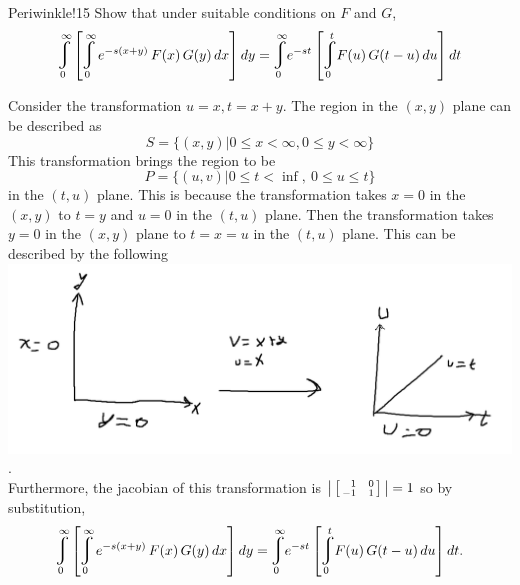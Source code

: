 \documentclass[titlepage]{article}
\begin{document}
\begin{cproblem}{5}{Periwinkle!15}
Show that under suitable conditions on $F$ and $G$,
$$\mlvarint\limits_{0}^\infty\left[\mlvarint\limits_{0}^{\infty}\, e^{-s(x+y)}\,F(x)\,G(y)\,dx\right]dy = \mlvarint\limits_{0}^{\infty}e^{-st}\left[\mlvarint\limits_{0}^{t}F(u)\,G(t-u)\,du\right]dt$$
\end{cproblem}
\begin{solution}
Consider the transformation $u = x, t = x+y.$ The region in the $(x,y)$ plane can be described as
$$S = \{(x,y)| 0\leq x < \infty, 0\leq y < \infty \}$$
This transformation brings the region to be
$$P = \{(u,v)| 0\leq t < \inf, \ 0\leq u \leq t\}$$
in the $(t,u)$ plane. This is because the transformation takes $x = 0$ in the $(x,y)$ to $t = y$ and $u = 0$ in the $(t,u)$ plane. Then the transformation takes $y = 0$ in the $(x,y)$ plane to $t = x = u$ in the $(t,u)$ plane. This can be described by the following
\includegraphics[scale=.40]{5transform.png}.\\
Furthermore, the jacobian of this transformation is $\big|\left[\begin{smallmatrix}\phantom{-}1 & \phantom{-}0 \\ -1 & \phantom{-}1\end{smallmatrix}\right]\big| = 1$ so by substitution, 
$$\mlvarint\limits_{0}^\infty\left[\mlvarint\limits_{0}^{\infty}\, e^{-s(x+y)}\,F(x)\,G(y)\,dx\right]dy = \mlvarint\limits_{0}^{\infty}e^{-st}\left[\mlvarint\limits_{0}^{t}F(u)\,G(t-u)\,du\right]dt.$$
\end{solution}
\end{document}
